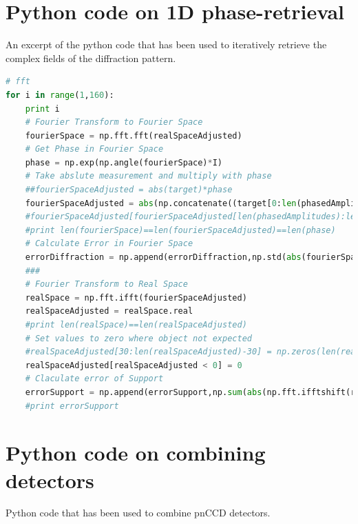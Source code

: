 \section{Python code on 1D phase-retrieval}\label{sec:1d-phase-retrieval-code}
An excerpt of the python code that has been used to iteratively retrieve the complex fields of the diffraction pattern.
\begin{lstlisting}[language=Python,frame=single,basicstyle=\footnotesize]
# fft
for i in range(1,160):
	print i
	# Fourier Transform to Fourier Space
	fourierSpace = np.fft.fft(realSpaceAdjusted)
	# Get Phase in Fourier Space
	phase = np.exp(np.angle(fourierSpace)*I)
	# Take abslute measurement and multiply with phase
	##fourierSpaceAdjusted = abs(target)*phase
	fourierSpaceAdjusted = abs(np.concatenate((target[0:len(phasedAmplitudes)],fourierSpace[len(phasedAmplitudes):len(phasedAmplitudes)*3],target[len(phasedAmplitudes)*3:len(target)]),axis=0))*phase
	#fourierSpaceAdjusted[fourierSpaceAdjusted[len(phasedAmplitudes):len(phasedAmplitudes)*3] > phasedAmplitudes[len(phasedAmplitudes)-1]] = phasedAmplitudes[len(phasedAmplitudes)-1]
	#print len(fourierSpace)==len(fourierSpaceAdjusted)==len(phase)
	# Calculate Error in Fourier Space
	errorDiffraction = np.append(errorDiffraction,np.std(abs(fourierSpace[0:len(phasedAmplitudes)]) - abs(target[0:len(phasedAmplitudes)])))
	###
	# Fourier Transform to Real Space
	realSpace = np.fft.ifft(fourierSpaceAdjusted)
	realSpaceAdjusted = realSpace.real
	#print len(realSpace)==len(realSpaceAdjusted)
	# Set values to zero where object not expected
	#realSpaceAdjusted[30:len(realSpaceAdjusted)-30] = np.zeros(len(realSpaceAdjusted)-60)
	realSpaceAdjusted[realSpaceAdjusted < 0] = 0
	# Claculate error of Support
	errorSupport = np.append(errorSupport,np.sum(abs(np.fft.ifftshift(realSpace)[0:len(realSpace)/2 - 30])))
	#print errorSupport
\end{lstlisting}
%
%
%
\section{Python code on combining detectors}\label{sec:combination-of-detectors-code}
Python code that has been used to combine pnCCD detectors.

%
%
%